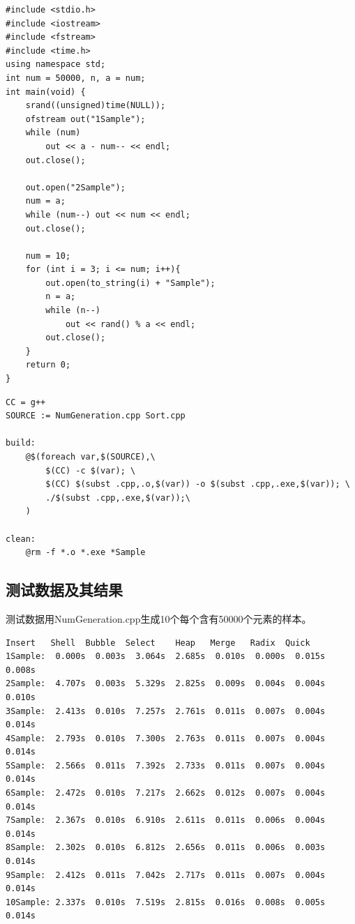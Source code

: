 \documentclass[a4paper,11pt,UTF8]{ctexart}
\begin{document}
\begin{lstlisting}[caption=Sort.cpp,captionpos=b]

\end{lstlisting}

\begin{lstlisting}[caption=NumGeneration.cpp,captionpos=b]
#include <stdio.h>
#include <iostream>
#include <fstream>
#include <time.h>
using namespace std;
int num = 50000, n, a = num;
int main(void) {
    srand((unsigned)time(NULL));
    ofstream out("1Sample");
    while (num)
        out << a - num-- << endl;
    out.close();

    out.open("2Sample");
    num = a;
    while (num--) out << num << endl;
    out.close();

    num = 10;
    for (int i = 3; i <= num; i++){
        out.open(to_string(i) + "Sample");
        n = a;
        while (n--)
            out << rand() % a << endl;
        out.close();
    }
    return 0;
}
\end{lstlisting}

\begin{lstlisting}[caption=Makefile,captionpos=b]
CC = g++
SOURCE := NumGeneration.cpp Sort.cpp

build:
    @$(foreach var,$(SOURCE),\
        $(CC) -c $(var); \
        $(CC) $(subst .cpp,.o,$(var)) -o $(subst .cpp,.exe,$(var)); \
        ./$(subst .cpp,.exe,$(var));\
    )

clean:
    @rm -f *.o *.exe *Sample
\end{lstlisting}

\subsection{测试数据及其结果}

测试数据用NumGeneration.cpp生成10个每个含有50000个元素的样本。

\begin{lstlisting}[caption=结果,captionpos=b]
          Insert   Shell  Bubble  Select    Heap   Merge   Radix  Quick
1Sample:  0.000s  0.003s  3.064s  2.685s  0.010s  0.000s  0.015s 0.008s
2Sample:  4.707s  0.003s  5.329s  2.825s  0.009s  0.004s  0.004s 0.010s
3Sample:  2.413s  0.010s  7.257s  2.761s  0.011s  0.007s  0.004s 0.014s
4Sample:  2.793s  0.010s  7.300s  2.763s  0.011s  0.007s  0.004s 0.014s
5Sample:  2.566s  0.011s  7.392s  2.733s  0.011s  0.007s  0.004s 0.014s
6Sample:  2.472s  0.010s  7.217s  2.662s  0.012s  0.007s  0.004s 0.014s
7Sample:  2.367s  0.010s  6.910s  2.611s  0.011s  0.006s  0.004s 0.014s
8Sample:  2.302s  0.010s  6.812s  2.656s  0.011s  0.006s  0.003s 0.014s
9Sample:  2.412s  0.011s  7.042s  2.717s  0.011s  0.007s  0.004s 0.014s
10Sample: 2.337s  0.010s  7.519s  2.815s  0.016s  0.008s  0.005s 0.014s
\end{lstlisting}
\end{document}
